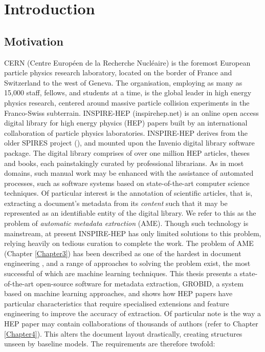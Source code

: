 
\chapter{Introduction} %

\label{Chapter1} %



\section{Motivation}

CERN (Centre Europ\'een de la Recherche Nucl\'eaire) is the foremost European particle physics research laboratory, located on the border of France and Switzerland to the west of Geneva. The organisation, employing as many as 15,000 staff, fellows, and students at a time, is the global leader in high energy physics research, centered around massive particle collision experiments in the Franco-Swiss subterrain. INSPIRE-HEP (inspirehep.net) is an online open access digital library for high energy physics (HEP) papers built by an international collaboration of particle physics laboratories. INSPIRE-HEP derives from the older SPIRES project (\cite{gentil2009information}), and mounted upon the Invenio digital library software package. The digital library comprises of over one million HEP articles, theses and books, each painstakingly curated by professional librarians. As in most domains, such manual work may be enhanced with the assistance of automated processes, such as software systems based on state-of-the-art computer science techniques. Of particular interest is the annotation of scientific articles, that is, extracting a document's metadata from its \emph{content} such that it may be represented as an identifiable entity of the digital library. We refer to this as the problem of \emph{automatic metadata extraction} (AME). Though such technology is mainstream, at present INSPIRE-HEP has only limited solutions to this problem, relying heavily on tedious curation to complete the work. The problem of AME (Chapter \ref{Chapter3}) has been described as one of the hardest in document engineering \cite{souza2014arctic}, and a range of approaches to solving the problem exist, the most successful of which are machine learning techniques. This thesis presents a state-of-the-art open-source software for metadata extraction, GROBID, a system based on machine learning approaches, and shows how HEP papers have particular characteristics that require specialised extensions and feature engineering to improve the accuracy of extraction. Of particular note is the way a HEP paper may contain collaborations of thousands of authors (refer to Chapter \ref{Chapter4}). This alters the document layout drastically, creating structures unseen by baseline models. The requirements are therefore twofold:


